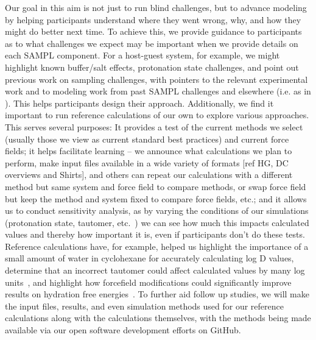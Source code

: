 \documentclass[11pt]{article}
\begin{document}
Our goal in this aim is not just to run blind challenges, but to advance modeling by helping participants understand where they went wrong, why, and how they might do better next time. 
To achieve this, we provide guidance to participants as to what challenges we expect may be important when we provide details on each SAMPL component.
For a host-guest system, for example, we might highlight known buffer/salt effects, protonation state challenges, and point out previous work on sampling challenges, with pointers to the relevant experimental work and to modeling work from past SAMPL challenges and elsewhere (i.e. as in \cite{mobley_predicting_2016}).
This helps participants design their approach.
Additionally, we find it important to run reference calculations of our own to explore various approaches. This serves several purposes:
It provides a test of the current methods we select (usually those we view as current standard best practices) and current force fields; 
it helps facilitate learning -- we announce what calculations we plan to perform, make input files available in a wide variety of formats [ref HG, DC overviews and Shirts], and others can repeat our calculations with a different method but same system and force field to compare methods, or swap force field but keep the method and system fixed to compare force fields, etc.; 
and it allows us to conduct sensitivity analysis, as by varying the conditions of our simulations (protonation state, tautomer, etc.~\cite{bannan_blind_2016}) we can see how much this impacts calculated values and thereby how important it is, even if participants don't do these tests.
Reference calculations have, for example, helped us highlight the importance of a small amount of water in cyclohexane for accurately calculating log D values, determine that an incorrect tautomer could affect calculated values by many log units~\cite{bannan_blind_2016}, and highlight how forcefield modifications could significantly improve results on hydration free energies~\cite{mobley_blind_2014-1}.
To further aid follow up studies, we will make the input files, results, and even simulation methods used for our reference calculations along with the calculations themselves, with the methods being made available via our open software development efforts on GitHub.
\end{document}
